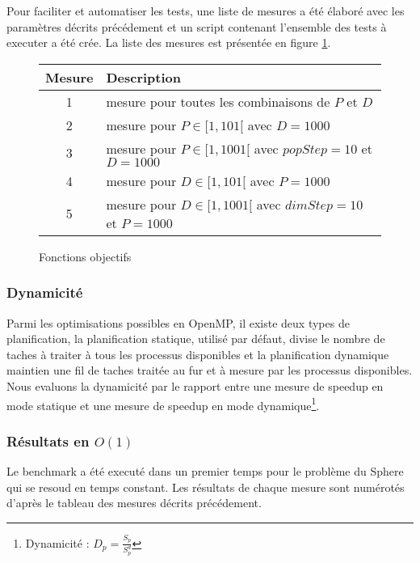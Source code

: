 Pour faciliter et automatiser les tests, une liste de mesures a été élaboré avec les paramètres décrits précédement et un script contenant l'ensemble des tests à executer a été crée. La liste des mesures est présentée en figure \ref{fig:liste_mesures}.

\begin{figure}[here]
  \centering
  \begin{tabular}{ | c | l | }
    \hline
    \textbf{Mesure} & \textbf{Description}\\\hline
    1 & mesure pour toutes les combinaisons de $P$ et $D$\\\hline
    2 & mesure pour $P \in [1, 101[$ avec $D = 1000$\\\hline
    3 & mesure pour $P \in [1, 1001[$ avec $popStep = 10$ et $D = 1000$\\\hline
    4 & mesure pour $D \in [1, 101[$ avec $P = 1000$\\\hline
    5 & mesure pour $D \in [1, 1001[$ avec $dimStep = 10$ et $P = 1000$\\\hline
  \end{tabular}
  \caption{Fonctions objectifs}
  \label{fig:liste_mesures}
\end{figure}

\subsubsection{Dynamicité}

Parmi les optimisations possibles en OpenMP, il existe deux types de planification, la planification statique, utilisé par défaut, divise le nombre de taches à traiter à tous les processus disponibles et la planification dynamique maintien une fil de taches traitée au fur et à mesure par les processus disponibles. Nous evaluons la dynamicité par le rapport entre une mesure de speedup en mode statique et une mesure de speedup en mode dynamique\footnote{Dynamicité : $D_p = \frac{S_p}{S_p^d}$}.

\subsubsection{Résultats en $O(1)$}

Le benchmark a été executé dans un premier temps pour le problème du Sphere qui se resoud en temps constant. Les résultats de chaque mesure sont numérotés d'après le tableau des mesures décrits précédement.


